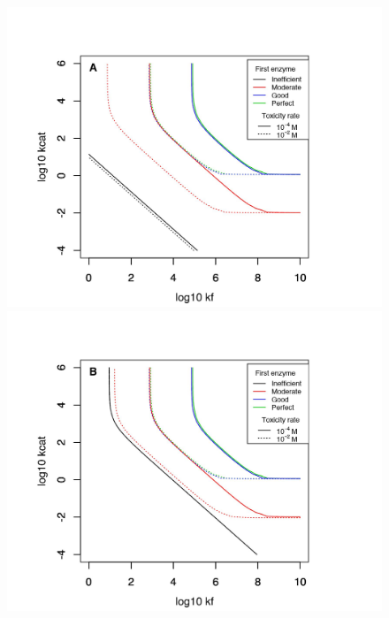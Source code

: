 \begin{figure}[h!]
\vspace{-0.5cm}
\centering
\includegraphics[scale=0.54,trim=0cm 0cm 0cm 0.5cm,clip]{pics/SM-Enzymes/2DFit_Landscape_2Enz_First_Enz_Influence&Tox&DegLow&Conc_Low.jpeg} 
\hspace{-0.5cm}
\includegraphics[scale=0.54,trim=0cm 0cm 0cm 0.5cm,clip]{pics/SM-Enzymes/2DFit_Landscape_2Enz_First_Enz_Influence&Tox&DegMod&Conc.jpeg}

\end{figure}
